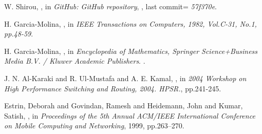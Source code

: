\documentclass[USenglish]{uit-thesis}
\begin{document}
\begin{thebibliography}{9}
W. Shirou,
,
\newblock in {\em GitHub: GitHub repository},
, last commit={ \textit{57f370e}}.

H. Garcia-Molina,
,
\newblock in {\em IEEE Transactions on Computers, 1982, Vol.C-31, No.1, pp.48-59}.

H. Garcia-Molina,
,
\newblock in {\em  Encyclopedia of Mathematics, Springer Science+Business Media B.V. / Kluwer Academic Publishers}.
.

J. N. Al-Karaki and R. Ul-Mustafa and A. E. Kamal,
,
\newblock in {\em  2004 Workshop on High Performance Switching and Routing, 2004. HPSR.}, pp.241-245.

Estrin, Deborah and Govindan, Ramesh and Heidemann, John and Kumar, Satish,
,
\newblock in {\em Proceedings of the 5th Annual ACM/IEEE International Conference on Mobile Computing and Networking}, 1999, pp.263--270.



\end{thebibliography}
\end{document}
